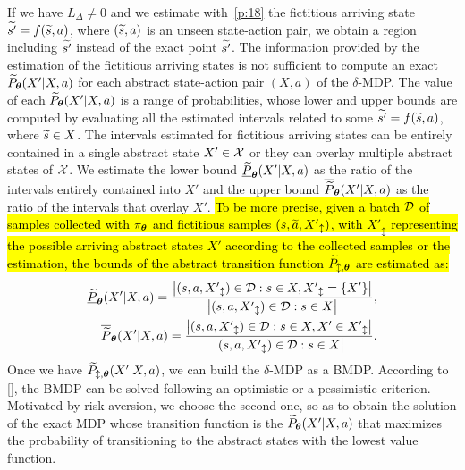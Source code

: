 If we have $L_{\Delta} \neq 0$ and we estimate with~\eqref{p:18} the fictitious arriving state $\widetilde{s'} = f(\widetilde{s}, a)$, where $(\widetilde{s},a)$ is an unseen state-action pair, we obtain a region including $\widetilde{s'}$ instead of the exact point $\widetilde{s'}$. The information provided by the estimation of the fictitious arriving states is not sufficient to compute an exact $\widetilde{P}_{\boldsymbol{\theta}}(X'|X,a)$ for each abstract state-action pair $(X,a)$ of the $\delta$-\ac{MDP}. The value of each $\widetilde{P}_{\boldsymbol{\theta}}(X'|X,a)$ is a range of probabilities, whose lower and upper bounds are computed by evaluating all the estimated intervals related to some $\widetilde{s'}=f(\widetilde{s}, a)$, where $\widetilde{s} \in X$. The intervals estimated for fictitious arriving states can be entirely contained in a single abstract state $X' \in \mathcal{X}$ or they can overlay multiple abstract states of $\mathcal{X}$. We estimate the lower bound $\underline{\widetilde{P}}_{\boldsymbol{\theta}}(X'|X,a)$ as the ratio of the intervals entirely contained into $X'$ and the upper bound $\overline{\widetilde{P}}_{\boldsymbol{\theta}}(X'|X,a)$ as the ratio of the intervals that overlay $X'$. \hl{To be more precise, given a batch $\mathcal{D}$ of samples collected with $\pi_{\boldsymbol{\theta}}$ and fictitious samples $(s,\widetilde{a},{X'}_{\updownarrow})$, with ${X'}_{\updownarrow}$ representing the possible arriving abstract states $X'$ according to the collected samples or the estimation, the bounds of the abstract transition function $\widetilde{P}_{\updownarrow, \boldsymbol{\theta}}$ are estimated as:}
\begin{align}
\underline{\widetilde{P}}_{\boldsymbol{\theta}}(X'|X,a) = \frac{\big|(s,a,{X'}_{\updownarrow}) \in \mathcal{D}: s \in X, {X'}_{\updownarrow}=\{X'\}\big|}{\big|(s,a,{X'}_{\updownarrow}) \in \mathcal{D}: s \in X\big|},\\
\overline{\widetilde{P}}_{\boldsymbol{\theta}}(X'|X,a) = \frac{\big|(s,a,{X'}_{\updownarrow}) \in \mathcal{D}: s \in X, X' \in {X'}_{\updownarrow}\big|}{\big|(s,a,{X'}_{\updownarrow}) \in \mathcal{D}: s \in X\big|}.
\end{align}Once we have $\widetilde{P}_{\updownarrow, \boldsymbol{\theta}}(X'|X,a)$, we can build the $\delta$-\ac{MDP} as a \ac{BMDP}. According to [\cite{givan2000bounded}], the \ac{BMDP} can be solved following an optimistic or a pessimistic criterion. Motivated by risk-aversion, we choose the second one, so as to obtain the solution of the exact \ac{MDP} whose transition function is the $\widetilde{P}_{\boldsymbol{\theta}}(X'|X,a)$ that maximizes the probability of transitioning to the abstract states with the lowest value function.

